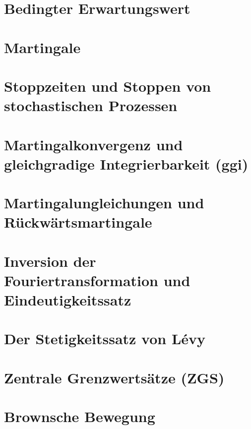 \documentclass[12pt]{scrartcl}
\begin{document}
	\section{Bedingter Erwartungswert}
	
	
	\section{Martingale}
	
	
	\section{Stoppzeiten und Stoppen von stochastischen Prozessen}
	
	
	\section{Martingalkonvergenz und gleichgradige Integrierbarkeit (ggi)}
	
	
	\section{Martingalungleichungen und Rückwärtsmartingale}
	
	
	\section{Inversion der Fouriertransformation und Eindeutigkeitssatz}
	
	
	\section{Der Stetigkeitssatz von Lévy}
	
	
	\section{Zentrale Grenzwertsätze (ZGS)}
	
	
	\section{Brownsche Bewegung}
	

	
	
\end{document}
